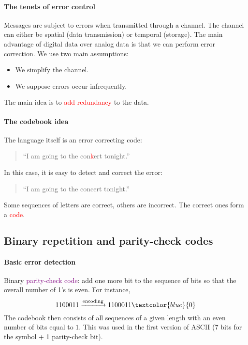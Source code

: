 \documentclass[a4paper, 11pt, openany]{book}
\numberwithin{equation}{section}
\theoremstyle{plain}
\theoremstyle{definition}
\newcommand{\Important}[1]{\textcolor{red}{#1}}
\newcommand{\Structure}[1]{\textcolor{blue}{#1}}
\newcommand{\Define}[1]{\textcolor{purple}{#1}}
\begin{document}
\paragraph{The tenets of error control}
Messages are subject to errors when transmitted through a channel. The channel can either be spatial (data transmission) or temporal (storage).
The main advantage of digital data over analog data is that  we can perform error correction. We use two main assumptions:
\begin{itemize}
	\item We simplify the channel.
	
	\item We suppose errors occur infrequently.
\end{itemize}
The main idea is to \Important{add redundancy} to the data.


\paragraph{The codebook idea}
The language itself is an error correcting code:
\begin{quote}
    ``I am going to the con\Important{k}ert tonight.''\\ 
\end{quote}
In this case, it is easy to detect and correct the error:
\begin{quote}
    ``I am going to the concert tonight.''
\end{quote}
Some sequences of letters are correct, others are incorrect. The correct ones form a \Important{code}.


\subsection{Binary repetition and parity-check codes}

\paragraph{Basic error detection}
Binary \Define{parity-check code}: add one more bit to the sequence of bits so that the overall number of 1's is even. For instance,
\[
    1100011 \xrightarrow{\text{encoding}} 1100011\Structure{0}
\]
The codebook then consists of all sequences of a given length with an even number of bits equal to $1$. This was used in the first version of ASCII (7 bits for the symbol + 1 parity-check bit).
\end{document}
